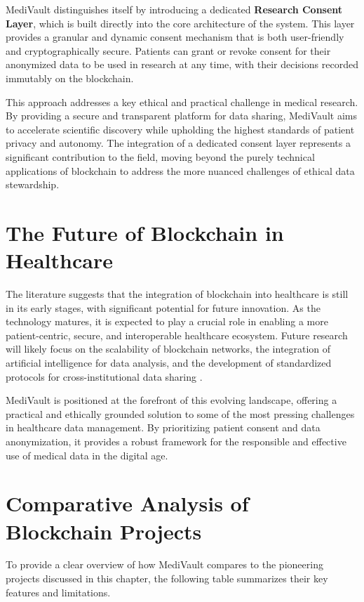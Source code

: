 MediVault distinguishes itself by introducing a dedicated \textbf{Research Consent Layer}, which is built directly into the core architecture of the system. This layer provides a granular and dynamic consent mechanism that is both user-friendly and cryptographically secure. Patients can grant or revoke consent for their anonymized data to be used in research at any time, with their decisions recorded immutably on the blockchain.

This approach addresses a key ethical and practical challenge in medical research. By providing a secure and transparent platform for data sharing, MediVault aims to accelerate scientific discovery while upholding the highest standards of patient privacy and autonomy. The integration of a dedicated consent layer represents a significant contribution to the field, moving beyond the purely technical applications of blockchain to address the more nuanced challenges of ethical data stewardship.

\section{The Future of Blockchain in Healthcare}
The literature suggests that the integration of blockchain into healthcare is still in its early stages, with significant potential for future innovation. As the technology matures, it is expected to play a crucial role in enabling a more patient-centric, secure, and interoperable healthcare ecosystem. Future research will likely focus on the scalability of blockchain networks, the integration of artificial intelligence for data analysis, and the development of standardized protocols for cross-institutional data sharing \autocite{damar2025blockchain}.

MediVault is positioned at the forefront of this evolving landscape, offering a practical and ethically grounded solution to some of the most pressing challenges in healthcare data management. By prioritizing patient consent and data anonymization, it provides a robust framework for the responsible and effective use of medical data in the digital age.

\section{Comparative Analysis of Blockchain Projects}
To provide a clear overview of how MediVault compares to the pioneering projects discussed in this chapter, the following table summarizes their key features and limitations.

